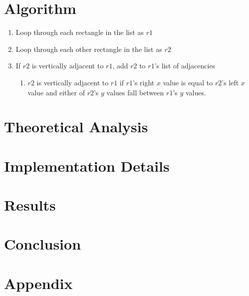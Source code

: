 \documentclass{Assignment}
\begin{document}
    \section{Algorithm}
        \begin{enumerate}
            \item Loop through each rectangle in the list as $r1$
            \item Loop through each other rectangle in the list as $r2$
            \item If $r2$ is vertically adjacent to $r1$, add $r2$ to $r1$'s list of adjacencies
                \begin{enumerate}
                    \item $r2$ is vertically adjacent to $r1$ if $r1$'s right $x$ value is equal to $r2$'s left $x$ value and either of $r2$'s $y$ values fall between $r1$'s $y$ values.
                \end{enumerate}
        \end{enumerate}
    
    \section{Theoretical Analysis}
    \section{Implementation Details}
    \section{Results}
    \section{Conclusion}
    \printbibliography %
    \section*{Appendix}

\end{document}
